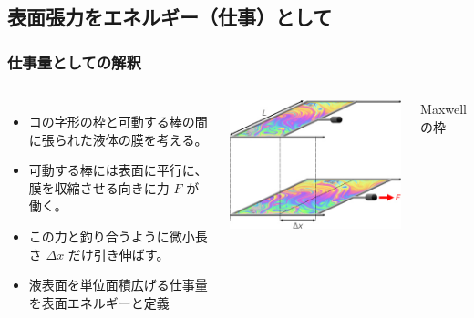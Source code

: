\documentclass[unicode,12pt]{beamer}%
\begin{document}
\subsection{表面張力をエネルギー（仕事）として}
\begin{frame}
	\frametitle{仕事量としての解釈}
	\vspace{-3mm}
	\begin{columns}[c, onlytextwidth]
				\begin{itemize}
					\item コの字形の枠と可動する棒の間に張られた液体の膜を考える。
					\item 可動する棒には表面に平行に、膜を収縮させる向きに力 $F$ が働く。
					\item この力と釣り合うように微小長さ $\Delta x$ だけ引き伸ばす。
					\item \alert{液表面を単位面積広げる仕事量}を表面エネルギーと定義
				\end{itemize}
		\centering
		\includegraphics[width=\textwidth]{maxwells-frame.jpg}

		\vspace{2mm}
		Maxwell の枠
	\end{columns}
	


\end{frame}
\end{document}

